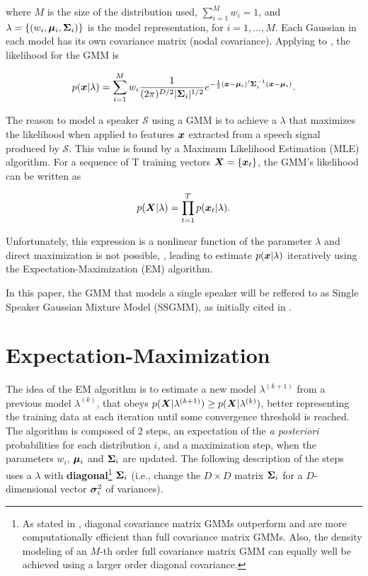\noindent where $M$ is the size of the distribution used, $\sum_{i=1}^M w_i = 1$, and $\lambda = \{(w_i, \boldsymbol{\mu}_i, \boldsymbol{\Sigma}_i)\}$ is the model representation, for $i = 1, ..., M$. Each Gaussian in each model has its own covariance matrix (nodal covariance). Applying  to , the likelihood for the GMM is

\begin{equation}
    \postpdf{\dvec{x}}{\lambda} = \dgaussianmixture.
    \label{eq:likelihood_gmm}
\end{equation}

The reason to model a speaker $\mathcal{S}$ using a GMM is to achieve a $\lambda$ that maximizes the likelihood when applied to features $\boldsymbol{x}$ extracted from a speech signal produced by $\mathcal{S}$. This value is found by a Maximum Likelihood Estimation (MLE) algorithm. For a sequence of T training vectors $\boldsymbol{X} = \{\boldsymbol{x}_t\}$, the GMM's likelihood can be written as

\begin{equation}
    \postpdf{\dvec{X}}{\lambda} = \prod_{t=1}^T \postpdf{\dvec{x}_t}{\lambda}.
    \label{eq:likelihood_gmm_mle}
\end{equation}

\noindent Unfortunately, this expression is a nonlinear function of the parameter $\lambda$ and direct maximization is not possible, , leading to estimate $p(\boldsymbol{x}|\lambda)$ iteratively using the Expectation-Maximization (EM) algorithm.

In this paper, the GMM that models a single speaker will be reffered to as Single Speaker Gaussian Mixture Model (SSGMM), as initially cited in .

\section{Expectation-Maximization}
\label{sec:em}

The idea of the EM algorithm is to estimate a new model $\lambda^{(k+1)}$ from a previous model $\lambda^{(k)}$, that obeys $p(\boldsymbol{X}|\lambda^{(k+1)}) \geq p(\boldsymbol{X}|\lambda^{(k)})$, better representing the training data at each iteration until some convergence threshold is reached. The algorithm is composed of 2 steps, an expectation of the \emph{a posteriori} probabilities for each distribution $i$, and a maximization step, when the parameters $w_i$, $\boldsymbol{\mu}_i$ and $\boldsymbol{\Sigma}_i$ are updated. The following description of the steps uses a $\lambda$ with \textbf{diagonal}\footnote{As stated in , diagonal covariance matrix GMMs outperform and are more computationally efficient than full covariance matrix GMMs. Also, the density modeling of an $M$-th order full covariance matrix GMM can equally well be achieved using a larger order diagonal covariance.} $\boldsymbol{\Sigma}_i$ (i.e., change the $D \times D$ matrix $\boldsymbol{\Sigma}_i$ for a $D$-dimensional vector $\boldsymbol{\sigma}_i^2$ of variances).

